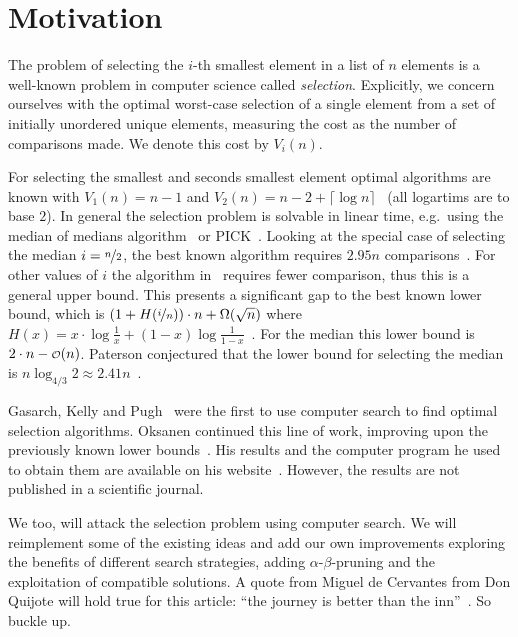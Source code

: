 \documentclass[twoside,leqno,twocolumn]{article}
\newcommand\smallO{
\mathchoice
{{\scriptstyle\mathcal{O}}}%
{{\scriptstyle\mathcal{O}}}%
{{\scriptscriptstyle\mathcal{O}}}%
{\scalebox{.50}{$\scriptscriptstyle\mathcal{O}$}}%
}
\begin{document}
\section{Motivation} \label{sec:motivation}

The problem of selecting the $i$-th smallest element in a list of $n$ elements is a well-known problem in computer science called \textit{selection}.
Explicitly, we concern ourselves with the optimal worst-case selection of a single element from a set of initially unordered unique elements, measuring the cost as the number of comparisons made.
We denote this cost by $V_i(n)$.

For selecting the smallest and seconds smallest element optimal algorithms are known with $V_1(n) = n - 1$ and $V_2(n) = n - 2 + \lceil \log n\rceil$~\cite{Knuth1973} (all logartims are to base $2$).
In general the selection problem is solvable in linear time, e.g.\ using the median of medians algorithm~\cite{Schoening1993} or PICK~\cite{Blum1972}.
Looking at the special case of selecting the median $i = \nicefrac{n}{2}$, the best known algorithm requires $2.95n$ comparisons~\cite{dor1999selecting}.
For other values of $i$ the algorithm in~\cite{dor1999selecting} requires fewer comparison, thus this is a general upper bound.
This presents a significant gap to the best known lower bound, which is $\left (1 + H(\nicefrac{i}{n}) \right ) \cdot n + \Omega(\sqrt n)$ where $H(x) = x \cdot \log \frac{1}{x} + (1 - x) \log \frac{1}{1 - x}$~\cite{bent1985finding}.
For the median this lower bound is $2 \cdot n - \smallO(n)$.
Paterson conjectured that the lower bound for selecting the median is $n \log_{4/3} 2 \approx 2.41n$~\cite{paterson1996progress}.

Gasarch, Kelly and Pugh~\cite{Gasarch1996} were the first to use computer search to find optimal selection algorithms.
Oksanen continued this line of work, improving upon the previously known lower bounds~\cite{Oksanen2006}.
His results and the computer program he used to obtain them are available on his website~\cite{Oksanen}.
However, the results are not published in a scientific journal.%

We too, will attack the selection problem using computer search.
We will reimplement some of the existing ideas and add our own improvements exploring the benefits of different search strategies, adding $\alpha$-$\beta$-pruning and the exploitation of compatible solutions.
A quote from Miguel de Cervantes from Don Quijote will hold true for this article: ``the journey is better than the inn''~\cite{cervantes_don_quijote}.
So buckle up.
\end{document}
